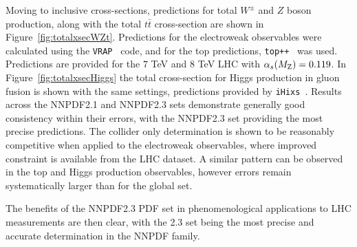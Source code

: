 Moving to inclusive cross-sections, predictions for total $W^\pm$ and $Z$ boson production, along with the total $t\bar{t}$ cross-section are shown in Figure~\ref{fig:totalxsecWZt}. Predictions for the electroweak observables were calculated using the {\tt VRAP}~\cite{Anastasiou:2003ds} code, and for the top predictions, {\tt top++}~\cite{Czakon:2011xx,Baernreuther:2012ws} was used. Predictions are provided for the $7$ TeV and $8$ TeV LHC with $\alpha_s(M_{\rm Z})=0.119$. In Figure~\ref{fig:totalxsecHiggs} the total cross-section for Higgs production in gluon fusion is shown with the same settings, predictions provided by {\tt iHixs}~\cite{Anastasiou:2011pi}. Results across the NNPDF2.1 and NNPDF2.3 sets demonstrate generally good consistency within their errors, with the NNPDF2.3 set providing the most precise predictions. The collider only determination is shown to be reasonably competitive when applied to the electroweak observables, where improved constraint is available from the LHC dataset. A similar pattern can be observed in the top and Higgs production observables, however errors remain systematically larger than for the global set.

The benefits of the NNPDF2.3 PDF set in phenomenological applications to LHC measurements are then clear, with the 2.3 set being the most precise and accurate determination in the NNPDF family.

\clearpage

